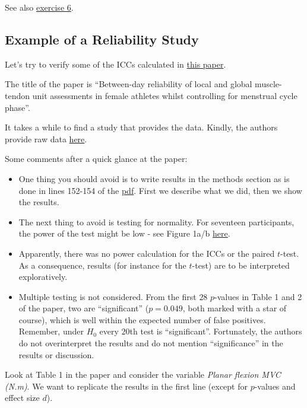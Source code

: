 \documentclass[
]{book}
\begin{document}
See also \hyperref[exercise6]{exercise 6}.

\subsection{Example of a Reliability Study}\label{example_RELStudy}

Let's try to verify some of the ICCs calculated in
\href{https://www.biorxiv.org/content/10.1101/2024.06.23.600286v2.abstract}{this paper}.

The title of the paper is ``Between-day reliability of local
and global muscle-tendon unit assessments in female athletes
whilst controlling for menstrual cycle phase''.

It takes a while to find a study that provides the data. Kindly, the authors
provide raw data \href{https://figshare.com/articles/dataset/Test-retest_dataset_xlsx/26477206?file=48128929}{here}.

Some comments after a quick glance at the paper:

\begin{itemize}
\item
  One thing you should avoid is to write results in the methods section as
  is done in lines 152-154 of the \href{https://www.biorxiv.org/content/10.1101/2024.06.23.600286v2.full.pdf}{pdf}.
  First we describe what we did, then we show the results.
\item
  The next thing to avoid is testing for normality. For seventeen participants,
  the power of the test might be low - see Figure 1a/b \href{https://www.nbi.dk/~petersen/Teaching/Stat2017/Power_Comparisons_of_Shapiro-Wilk_Kolmogorov-Smirn.pdf}{here}.
\item
  Apparently, there was no power calculation for the ICCs or the paired \(t\)-test.
  As a consequence, results (for instance for the \(t\)-test) are to be interpreted exploratively.
\item
  Multiple testing is not considered.
  From the first \(28\) \(p\)-values in Table 1 and 2 of the paper, two are ``significant''
  (\(p=0.049\), both marked with a star of course),
  which is well within the expected number of false positives. Remember,
  under \(H_0\) every \(20\)th test is ``significant''.
  Fortunately, the authors do not overinterpret the results and
  do not mention ``significance'' in the results or discussion.
\end{itemize}

Look at Table 1 in the paper and consider the variable \emph{Planar flexion MVC (N.m)}.
We want to replicate the results in the first line
(except for \(p\)-values and effect size \(d\)).
\end{document}
